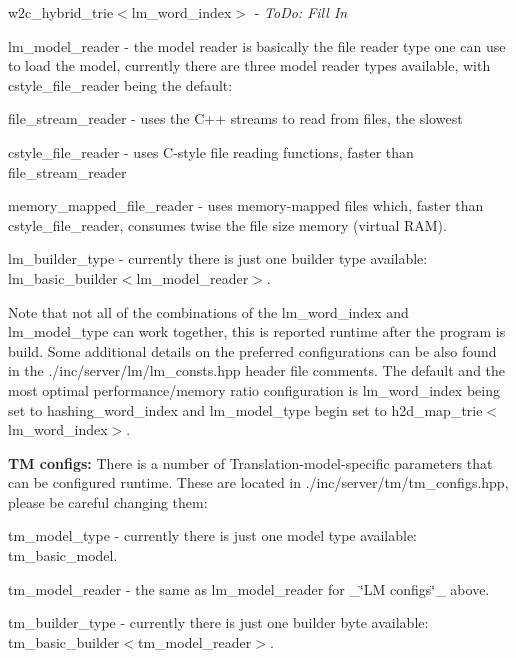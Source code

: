 \begin{DoxyItemize}
\begin{DoxyItemize}
\item {\ttfamily w2c\+\_\+hybrid\+\_\+trie$<$lm\+\_\+word\+\_\+index$>$} -\/ {\itshape To\+Do\+: Fill In}
\end{DoxyItemize}
\item {\ttfamily lm\+\_\+model\+\_\+reader} -\/ the model reader is basically the file reader type one can use to load the model, currently there are three model reader types available, with {\ttfamily cstyle\+\_\+file\+\_\+reader} being the default\+:
\begin{DoxyItemize}
\item {\ttfamily file\+\_\+stream\+\_\+reader} -\/ uses the C++ streams to read from files, the slowest
\item {\ttfamily cstyle\+\_\+file\+\_\+reader} -\/ uses C-\/style file reading functions, faster than {\ttfamily file\+\_\+stream\+\_\+reader}
\item {\ttfamily memory\+\_\+mapped\+\_\+file\+\_\+reader} -\/ uses memory-\/mapped files which, faster than {\ttfamily cstyle\+\_\+file\+\_\+reader}, consumes twise the file size memory (virtual R\+A\+M).
\end{DoxyItemize}
\item {\ttfamily lm\+\_\+builder\+\_\+type} -\/ currently there is just one builder type available\+: {\ttfamily lm\+\_\+basic\+\_\+builder$<$lm\+\_\+model\+\_\+reader$>$}.
\end{DoxyItemize}

Note that not all of the combinations of the {\ttfamily lm\+\_\+word\+\_\+index} and {\ttfamily lm\+\_\+model\+\_\+type} can work together, this is reported runtime after the program is build. Some additional details on the preferred configurations can be also found in the {\ttfamily ./inc/server/lm/lm\+\_\+consts.hpp} header file comments. The default and the most optimal performance/memory ratio configuration is {\ttfamily lm\+\_\+word\+\_\+index} being set to {\ttfamily hashing\+\_\+word\+\_\+index} and {\ttfamily lm\+\_\+model\+\_\+type} begin set to {\ttfamily h2d\+\_\+map\+\_\+trie$<$lm\+\_\+word\+\_\+index$>$}.

{\bfseries T\+M configs\+:} There is a number of Translation-\/model-\/specific parameters that can be configured runtime. These are located in {\ttfamily ./inc/server/tm/tm\+\_\+configs.hpp}, please be careful changing them\+:


\begin{DoxyItemize}
\item {\ttfamily tm\+\_\+model\+\_\+type} -\/ currently there is just one model type available\+: {\ttfamily tm\+\_\+basic\+\_\+model}.
\item {\ttfamily tm\+\_\+model\+\_\+reader} -\/ the same as {\ttfamily lm\+\_\+model\+\_\+reader} for \+\_\+\char`\"{}\+L\+M configs\char`\"{}\+\_\+ above.
\item {\ttfamily tm\+\_\+builder\+\_\+type} -\/ currently there is just one builder byte available\+: {\ttfamily tm\+\_\+basic\+\_\+builder$<$tm\+\_\+model\+\_\+reader$>$}.
\end{DoxyItemize}

